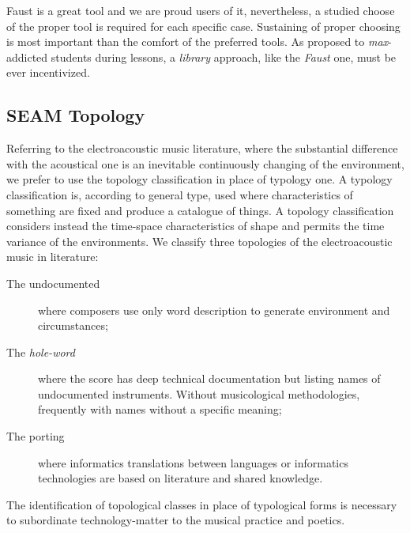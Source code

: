 \documentclass[twoside,a4paper]{article}
\begin{document}
Faust is a great tool and we are proud users of it, nevertheless, a studied
choose of the proper tool is required for each specific case. Sustaining of
proper choosing is most important than the comfort of the preferred tools. As
proposed to \emph{max}-addicted students during lessons, a \emph{library}
approach, like the \emph{Faust} one, must be ever incentivized.


\subsection{SEAM Topology}

Referring to the electroacoustic music literature, where the substantial
difference with the acoustical one is an inevitable continuously changing of the
environment, we prefer to use the topology classification in place of typology
one. A typology classification is, according to general type, used where
characteristics of something are fixed and produce a catalogue of things. A
topology classification considers instead the time-space characteristics of
shape and permits the time variance of the environments. We classify three
topologies of the electroacoustic music in literature:

\begin{description}
  \item[The undocumented] where composers use only word description to generate
  environment and circumstances;
  \item[The \emph{hole-word}] where the score has deep technical documentation
  but listing names of undocumented instruments. Without musicological
  methodologies, frequently with names without a specific meaning;
  \item[The porting] where informatics translations between languages or
  informatics technologies are based on literature and shared knowledge.
\end{description}

The identification of topological classes in place of typological forms is
necessary to subordinate technology-matter to the musical practice and poetics.

\end{document}
